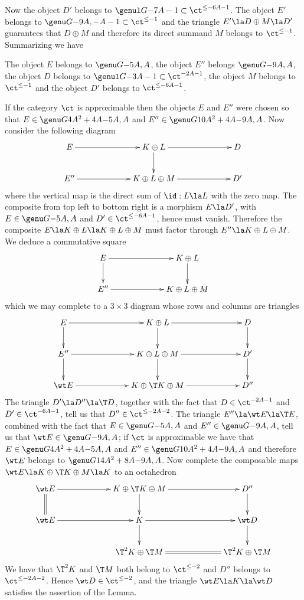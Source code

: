 \documentclass[11pt]{amsart}
\begin{document}
Now
the object $D'$ belongs to $\genul G{}{-7A-1}\subset\ct^{\leq-6A-1}$.
The object $E'$ belongs to $\genu G{}{-9A,-A-1}\subset\ct^{\leq-1}$
and the triangle $E'\la D\oplus M\la D'$ guarantees that $D\oplus M$
and therefore its direct summand $M$ belongs to $\ct^{\leq-1}$.
Summarizing we have
\be
\item
  The object $E$ belongs to $\genu G{}{-5A,A}$,
  the object $E''$ belongs $\genu G{}{-9A,A}$,
  the object $D$ belongs to $\genul G{}{-3A-1}\subset\ct^{-2A-1}$,
  the object $M$ belongs to $\ct^{\leq-1}$ and
  the object $D'$ belongs to $\ct^{\leq-6A-1}$.
\item
  If the category $\ct$ is approximable then the objects $E$ and $E''$
  were chosen so that $E\in\genu G{4A^2+4A}{-5A,A}$
  and  $E''\in\genu G{10A^2+4A}{-9A,A}$.
\ee
Now consider the following diagram
\[\xymatrix@C+40pt{
  E\ar[r] & K\oplus L\ar[r] \ar[d] & D\\
  E''\ar[r] & K\oplus L\oplus M\ar[r] & D'
}\]
where the vertical map is the direct sum of $\id:L\la L$ with the zero map.
The composite from top left to bottom right is a morphism
$E\la D'$, with $E\in\genu G{}{-5A,A}$ and
$D'\in\ct^{\leq-6A-1}$, hence must vanish. Therefore the composite
$E\la K\oplus L\la K\oplus L\oplus M$ must factor through
$E''\la K\oplus L\oplus M$.
We deduce a commutative square
\[\xymatrix@C+40pt{
  E\ar[r]\ar[d] & K\oplus L \ar[d] \\
  E''\ar[r] & K\oplus L\oplus M
}\]
which we may complete to a $3\times3$ diagram whose rows and columns
are triangles
\[\xymatrix@C+40pt{
  E\ar[r]\ar[d] & K\oplus L\ar[r] \ar[d] & D\ar[d]\\
  E''\ar[r]\ar[d] & K\oplus L\oplus M\ar[r]\ar[d] & D'\ar[d]\\
  \wt E\ar[r] & K\oplus \T K\oplus M\ar[r] & D''
}\]
The triangle $D'\la D''\la \T D$, together with the fact that
$D\in\ct^{-2A-1}$ and $D'\in\ct^{-6A-1}$, tell us that $D''\in\ct^{\leq-2A-2}$.
The triangle $E''\la \wt E\la \T E$, combined with
the fact that $E\in\genu G{}{-5A,A}$
and  $E''\in\genu G{}{-9A,A}$,
tell us that $\wt E\in\genu G{}{-9A,A}$; if $\ct$ is approximable
we have that $E\in\genu G{4A^2+4A}{-5A,A}$
and  $E''\in\genu G{10A^2+4A}{-9A,A}$ and therefore $\wt E$
belongs to $\genu G{14A^2+8A}{-9A,A}$. Now complete the composable
maps $\wt E\la K\oplus \T K\oplus M\la K$ to an octahedron
\[\xymatrix@C+40pt{
  \wt E\ar[r]\ar@{=}[d] & K\oplus \T K\oplus M\ar[r]\ar[d] & D''\ar[d]\\
  \wt E\ar[r]           & K                \ar[r]\ar[d]   & \wt D\ar[d] \\
    & \T^2K\oplus\T M\ar@{=}[r] &\T^2 K\oplus\T M
}\]
We have that $\T^2K$ and $\T M$ both belong to $\ct^{\leq-2}$ and
$D''$ belongs to $\ct^{\leq-2A-2}$. Hence $\wt D\in\ct^{\leq-2}$, and
the triangle $\wt E\la K\la \wt D$ satisfies the assertion of
the Lemma.
\eprf
\end{document}
